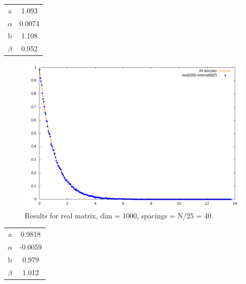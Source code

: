 \documentclass[12pt, a4paper, notitlepage]{report}
\begin{document}
\begin{table}[H]
	\centering
	\begin{tabular}{|c|c|}
		
		\hline
 
		a			& 1.093	\\
		$\alpha$	& 0.0074	\\
		b			& 1.108	\\
		$\beta$		& 0.952	\\
		
		\hline
		
	\end{tabular}
\end{table}

\newpage

\begin{figure}[H]
	\centering
	\includegraphics[scale=0.6]{./Real_1000/hist_interval_0040_fit.png} 
	\caption{Results for real matrix, dim = 1000, spacings = N/25 = 40.}
	\label{figure_lambdas}
\end{figure}

\begin{table}[H]
	\centering
	\begin{tabular}{|c|c|}
		
		\hline

		a			& 0.9818	\\
		$\alpha$	& -0.0059	\\
		b			& 0.979	\\
		$\beta$		& 1.012	\\
		
		\hline
		
	\end{tabular}
\end{table}
\end{document}
